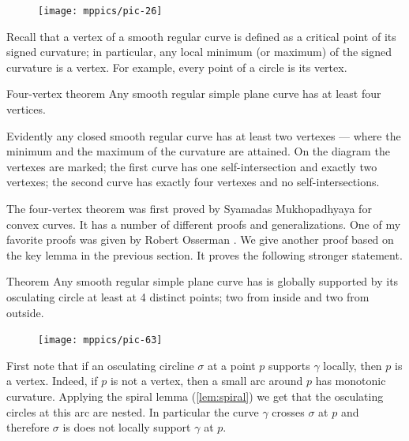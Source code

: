 {

\begin{figure}
\vskip-4mm
\centering
\texttt{[image: mppics/pic-26]}
\vskip0mm
\end{figure}

Recall that a vertex of a smooth regular curve is defined as a critical point of its signed curvature;
in particular, any local minimum (or maximum) of the signed curvature is a vertex.
For example, every point of a circle is its vertex.

\begin{thm}{Four-vertex theorem}\label{thm:4-vert}
Any smooth regular simple plane curve has at least four
vertices.
\end{thm}

}

Evidently any closed smooth regular curve has at least two vertexes --- where the minimum and the maximum of the curvature are attained.
On the diagram the vertexes are marked;
the first curve has one self-intersection and exactly two vertexes;
the second curve has exactly four vertexes and no self-intersections.

The four-vertex theorem was first proved by Syamadas Mukhopadhyaya \cite{mukhopadhyaya} for convex curves.
It has a number of different proofs and generalizations.
One of my favorite proofs was given by Robert Osserman \cite{osserman}.
We give another proof based on the key lemma in the previous section.
It proves the following stronger statement.

\begin{thm}{Theorem}\label{thm:4-vert-supporting}
Any smooth regular simple plane curve has is globally supported by its osculating circle at least at 4 distinct points; two from inside and two from outside.
\end{thm}

{

\begin{figure}
\vskip-2mm
\centering
\texttt{[image: mppics/pic-63]}
\vskip0mm
\end{figure}

First note that if an osculating circline $\sigma$ at a point $p$ supports $\gamma$ locally, then $p$ is a vertex.
Indeed, if $p$ is not a vertex, then a small arc around $p$ has monotonic curvature.
Applying the spiral lemma (\ref{lem:spiral}) we get that the osculating circles at this arc are nested.
In particular the curve $\gamma$ crosses $\sigma$ at $p$ and therefore $\sigma$ is does not locally support $\gamma$ at $p$.
\qeds

}

